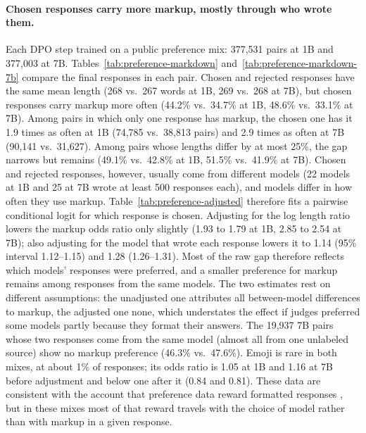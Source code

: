 \documentclass[acmsmall,screen,review,anonymous]{acmart}
\begin{document}
\paragraph{Chosen responses carry more markup, mostly through who wrote them.} Each DPO step trained on a public preference mix: 377,531 pairs at 1B and 377,003 at 7B. Tables~\ref{tab:preference-markdown} and~\ref{tab:preference-markdown-7b} compare the final responses in each pair. Chosen and rejected responses have the same mean length (268 vs.\ 267 words at 1B, 269 vs.\ 268 at 7B), but chosen responses carry markup more often (44.2\% vs.\ 34.7\% at 1B, 48.6\% vs.\ 33.1\% at 7B). Among pairs in which only one response has markup, the chosen one has it 1.9 times as often at 1B (74,785 vs.\ 38,813 pairs) and 2.9 times as often at 7B (90,141 vs.\ 31,627). Among pairs whose lengths differ by at most 25\%, the gap narrows but remains (49.1\% vs.\ 42.8\% at 1B, 51.5\% vs.\ 41.9\% at 7B). Chosen and rejected responses, however, usually come from different models (22 models at 1B and 25 at 7B wrote at least 500 responses each), and models differ in how often they use markup. Table~\ref{tab:preference-adjusted} therefore fits a pairwise conditional logit for which response is chosen. Adjusting for the log length ratio lowers the markup odds ratio only slightly (1.93 to 1.79 at 1B, 2.85 to 2.54 at 7B); also adjusting for the model that wrote each response lowers it to 1.14 (95\% interval 1.12--1.15) and 1.28 (1.26--1.31). Most of the raw gap therefore reflects which models' responses were preferred, and a smaller preference for markup remains among responses from the same models. The two estimates rest on different assumptions: the unadjusted one attributes all between-model differences to markup, the adjusted one none, which understates the effect if judges preferred some models partly because they format their answers. The 19,937 7B pairs whose two responses come from the same model (almost all from one unlabeled source) show no markup preference (46.3\% vs.\ 47.6\%). Emoji is rare in both mixes, at about 1\% of responses; its odds ratio is 1.05 at 1B and 1.16 at 7B before adjustment and below one after it (0.84 and 0.81). These data are consistent with the account that preference data reward formatted responses \cite{zhang2025lists}, but in these mixes most of that reward travels with the choice of model rather than with markup in a given response.




\end{document}
